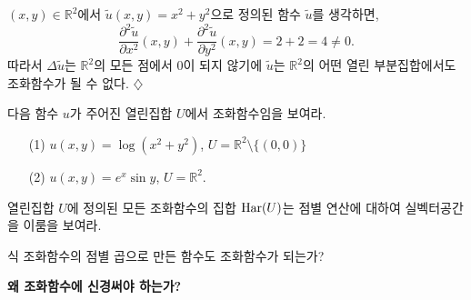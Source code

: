 \begin{salt_example}\label{example-5-2}
$(x,y)\in \mathbb R^2$에서 $\tilde u(x,y) = x^2+y^2$으로 정의된 함수  $\tilde u$를 생각하면,
\[
\dfrac{\partial^2 \tilde u}{\partial x^2} (x,y) 
+ \dfrac{\partial^2 \tilde u}{\partial y^2} (x,y) = 2+2=4\ne 0.
\]
따라서 $\Delta \tilde u$는 $\mathbb R^2$의 모든 점에서 $0$이 되지 않기에
$\tilde u$는 $\mathbb R^2$의 어떤 열린 부분집합에서도 조화함수가 될 수 없다.
\hfill $\diamondsuit$
\end{salt_example}

\begin{salt_exercise}\label{ex-5-1}
다음 함수 $u$가 주어진 열린집합 $U$에서 조화함수임을 보여라.
\begin{itemize}
\item[(1)] $u(x,y) = \log (x^2+y^2)$, $U = \mathbb R^2\setminus \{(0,0)\}$
\item[(2)] $u(x,y) = e^x\sin y$, $U=\mathbb R^2$.
\end{itemize}
\end{salt_exercise}

\begin{salt_exercise}\label{ex-5-2}
열린집합 $U$에 정의된 모든 조화함수의 집합 $\mathop{\mathrm{Har}}(U)$는
점별 연산에 대하여 실벡터공간을 이룸을 보여라.
\end{salt_exercise}

\begin{salt_exercise}\label{ex-5-3}식
조화함수의 점별 곱으로 만든 함수도 조화함수가 되는가?
\end{salt_exercise}

{\bf 왜 조화함수에 신경써야 하는가?}

